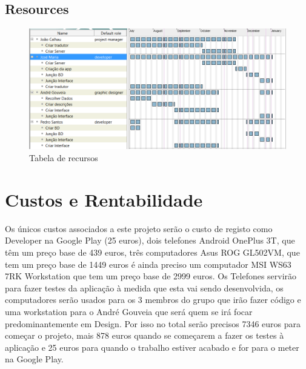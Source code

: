 \documentclass[a4paper]{article}
\begin{document}
\subsection{Resources}

\begin{figure}[!ht]
\centering
\includegraphics[width=120mm]{resurces.png}
\caption{Tabela de recursos}
\end{figure}

\newpage

\section{Custos e Rentabilidade}

Os únicos custos associados a este projeto serão o custo de registo como Developer na Google Play (25 euros), dois telefones Android OnePlus 3T, que têm um preço base de 439 euros, três computadores Asus ROG GL502VM, que tem um preço base de 1449 euros é ainda preciso um computador MSI WS63 7RK Workstation que tem um preço base de 2999 euros. Os Telefones servirão para fazer testes da aplicação à medida que esta vai sendo desenvolvida, os computadores serão usados para os 3 membros do grupo que irão fazer código e uma workstation para o André Gouveia que será quem se irá focar predominantemente em Design. Por isso no total serão precisos 7346 euros para começar o projeto, mais 878 euros quando se começarem a fazer os testes à aplicação e 25 euros para quando o trabalho estiver acabado e for para o meter na Google Play.
\end{document}

